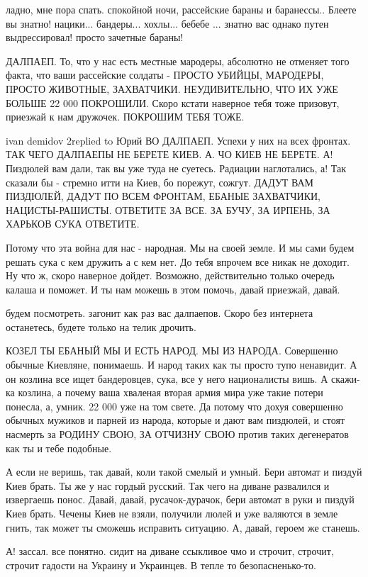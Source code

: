 ладно, мне пора спать. спокойной ночи, рассейские бараны и баранессы.. Блеете
вы знатно! нацики... бандеры... хохлы... бебебе ... знатно вас однако путен
выдрессировал! просто зачетные бараны!

ДАЛПАЕП. То, что у нас есть местные мародеры, абсолютно не отменяет того факта,
что ваши рассейские солдаты - ПРОСТО УБИЙЦЫ, МАРОДЕРЫ, ПРОСТО ЖИВОТНЫЕ,
ЗАХВАТЧИКИ. НЕУДИВИТЕЛЬНО, ЧТО ИХ УЖЕ БОЛЬШЕ 22 000 ПОКРОШИЛИ. Скоро кстати
наверное тебя тоже призовут, приезжай к нам дружочек. ПОКРОШИМ ТЕБЯ ТОЖЕ.

ivan demidov 2replied to Юрий ВО ДАЛПАЕП. Успехи у них на всех фронтах. ТАК
ЧЕГО ДАЛПАЕПЫ НЕ БЕРЕТЕ КИЕВ. А. ЧО КИЕВ НЕ БЕРЕТЕ. А! Пиздюлей вам дали, так
вы уже туда не суетесь. Радиации наглотались, а! Так сказали бы - стремно итти
на Киев, бо порежут, сожгут. ДАДУТ ВАМ ПИЗДЮЛЕЙ, ДАДУТ ПО ВСЕМ ФРОНТАМ, ЕБАНЫЕ
ЗАХВАТЧИКИ, НАЦИСТЫ-РАШИСТЫ. ОТВЕТИТЕ ЗА ВСЕ. ЗА БУЧУ, ЗА ИРПЕНЬ, ЗА ХАРЬКОВ
СУКА ОТВЕТИТЕ.

Потому что эта война для нас - народная. Мы на своей земле. И мы сами будем
решать сука с кем дружить а с кем нет. До тебя впрочем все никак не доходит. Ну
что ж, скоро наверное дойдет. Возможно, действительно только очередь калаша и
поможет. И ты нам можешь в этом помочь, давай приезжай, давай.

будем посмотреть. загонит как раз вас далпаепов. Скоро без интернета
останетесь, будете только на телик дрочить.

КОЗЕЛ ТЫ ЕБАНЫЙ МЫ И ЕСТЬ НАРОД. МЫ ИЗ НАРОДА. Совершенно обычные Киевляне,
понимаешь. И народ таких как ты просто тупо ненавидит. А он козлина все ищет
бандеровцев, сука, все у него националисты вишь. А скажи-ка козлина, а почему
ваша хваленая вторая армия мира уже такие потери понесла, а, умник. 22 000 уже
на том свете. Да потому что дохуя совершенно обычных мужиков и парней из
народа, которые и дают вам пиздюлей, и стоят насмерть за РОДИНУ СВОЮ, ЗА
ОТЧИЗНУ СВОЮ против таких дегенератов как ты и тебе подобные.

А если не веришь, так давай, коли такой смелый и умный. Бери автомат и пиздуй
Киев брать. Ты же у нас гордый русский. Так чего на диване развалился и
извергаешь понос. Давай, давай, русачок-дурачок, бери автомат в руки и пиздуй
Киев брать. Чечены Киев не взяли, получили люлей и уже валяются в земле гнить,
так может ты сможешь исправить ситуацию. А, давай, героем же станешь.

А! зассал. все понятно. сидит на диване ссыкливое чмо и строчит, строчит,
строчит гадости на Украину и Украинцев. В тепле то безопасненько-то.

